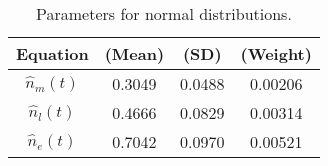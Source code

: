 \begin{table}\centering
	\begin{tabular}{cccc}
	\hline
	\textbf{Equation} \boldmath{$\hat{n}_x(t)$} & \boldmath{$\mu_x$} \textbf{(Mean)} & \boldmath{$\sigma_x$} \textbf{(SD)} & \boldmath{$\beta_x$} \textbf{(Weight)} \\
	\hline
	$\hat{n}_m(t)$ & 0.3049 & 0.0488 & 0.00206 \\
	$\hat{n}_l(t)$ & 0.4666 & 0.0829 & 0.00314 \\
	$\hat{n}_e(t)$ & 0.7042 & 0.0970 & 0.00521\\
	\hline
	\end{tabular}
	\caption{Parameters for normal distributions.}
	\label{ch4:tab:starting-a-trip-probability}
\end{table}
